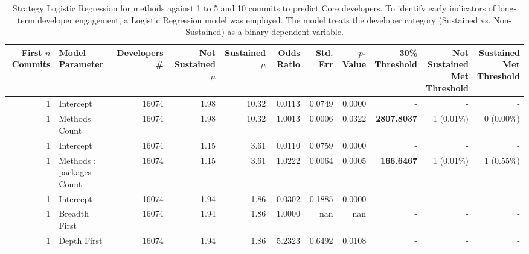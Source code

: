\begin{landscape}
\begin{table}[H]
\centering
\setlength{\tabcolsep}{2pt}
\caption[Strategy Logistic Regression Core for methods for 1 to 5 and 10]{Strategy Logistic Regression for methods against 1 to 5 and 10 commits to predict Core developers. 
    To identify early indicators of long-term developer engagement, a Logistic Regression model was employed. The model treats the developer category (Sustained vs. Non-Sustained) as a binary dependent variable. }
\begin{tabular}{r l r r r r r r r r r}
\toprule
\makecell[t]{\textbf{First $n$}\\\textbf{Commits}} & \makecell[t]{\textbf{Model}\\\textbf{Parameter}} & \makecell[t]{\textbf{Developers}\\\textbf{\#}} & \makecell[t]{\textbf{Not}\\\textbf{Sustained}\\\textbf{$\mu$}} & \makecell[t]{\textbf{Sustained}\\\textbf{$\mu$}} & \textbf{Odds Ratio} & \textbf{Std. Err} & \textbf{$p$-Value} & \makecell[t]{\textbf{30\%}\\\textbf{Threshold}} & \makecell[t]{\textbf{Not}\\\textbf{Sustained}\\\textbf{Met}\\\textbf{Threshold}} & \makecell[t]{\textbf{Sustained}\\\textbf{Met}\\\textbf{Threshold}} \\ 
\midrule
1 & Intercept & 16074 & 1.98 & 10.32 & 0.0113 & 0.0749 & 0.0000 & - & - & - \\ 
1 & Methods Count & 16074 & 1.98 & 10.32 & 1.0013 & 0.0006 & 0.0322 & \textbf{2807.8037} & 1 (0.01\%) & 0 (0.00\%) \\ 
1 & Intercept & 16074 & 1.15 & 3.61 & 0.0110 & 0.0759 & 0.0000 & - & - & - \\ 
1 & Methods : packages Count & 16074 & 1.15 & 3.61 & 1.0222 & 0.0064 & 0.0005 & \textbf{166.6467} & 1 (0.01\%) & 1 (0.55\%) \\ 
1 & Intercept & 16074 & 1.94 & 1.86 & 0.0302 & 0.1885 & 0.0000 & - & - & - \\ 
1 & Breadth First & 16074 & 1.94 & 1.86 & 1.0000 & nan & nan & - & - & - \\ 
1 & Depth First & 16074 & 1.94 & 1.86 & 5.2323 & 0.6492 & 0.0108 & - & - & - \\ 

\end{tabular}
\end{table}
\end{landscape}
